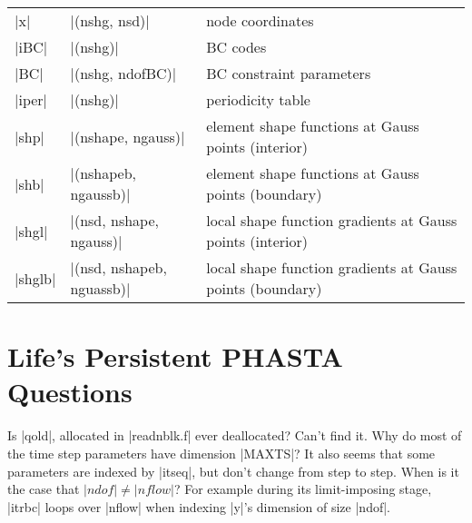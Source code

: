 \documentclass[11pt]{article}
\begin{document}
\begin{center}
\begin{tabular}{@{}lll@{}}
|x|      & |(nshg, nsd)|             & node coordinates \\
|iBC|    & |(nshg)|                  & BC codes \\
|BC|     & |(nshg, ndofBC)|          & BC constraint parameters \\
|iper|   & |(nshg)|				    & periodicity table \\
|shp|    & |(nshape, ngauss)|        & element shape functions at Gauss points (interior) \\
|shb|    & |(nshapeb, ngaussb)|      & element shape functions at Gauss points (boundary) \\
|shgl|   & |(nsd, nshape, ngauss)|   & local shape function gradients at Gauss points (interior) \\
|shglb|  & |(nsd, nshapeb, nguassb)| & local shape function gradients at Gauss points (boundary) \\
\bottomrule
\end{tabular}
\label{tbl:symbols}
\end{center}

\section{Life's Persistent PHASTA Questions}
\begin{outline}[deep]
	\1 Is |qold|, allocated in |readnblk.f| ever deallocated? Can't find it.
	\1 Why do most of the time step parameters have dimension |MAXTS|?
		\2 It also seems that some parameters are indexed by |itseq|, but don't change from step to step.
	\1 When is it the case that $|ndof| \ne |nflow|$? For example during its limit-imposing stage, |itrbc| loops over |nflow| when indexing |y|'s dimension of size |ndof|.
\end{outline}

\label{lastpage}
\end{document}
